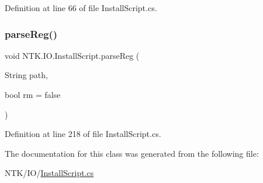 Definition at line 66 of file Install\+Script.\+cs.

\mbox{\label{class_n_t_k_1_1_i_o_1_1_install_script_a3fcedaaa50f635f74b6e10d9db983f61}} 
\subsubsection{\texorpdfstring{parseReg()}{parseReg()}}
{\footnotesize\ttfamily void N\+T\+K.\+I\+O.\+Install\+Script.\+parse\+Reg (\begin{DoxyParamCaption}\item[{String}]{path,  }\item[{bool}]{rm = {\ttfamily false} }\end{DoxyParamCaption})}



Definition at line 218 of file Install\+Script.\+cs.



The documentation for this class was generated from the following file\+:\begin{DoxyCompactItemize}
\item 
N\+T\+K/\+I\+O/\mbox{\hyperlink{_install_script_8cs}{Install\+Script.\+cs}}\end{DoxyCompactItemize}
